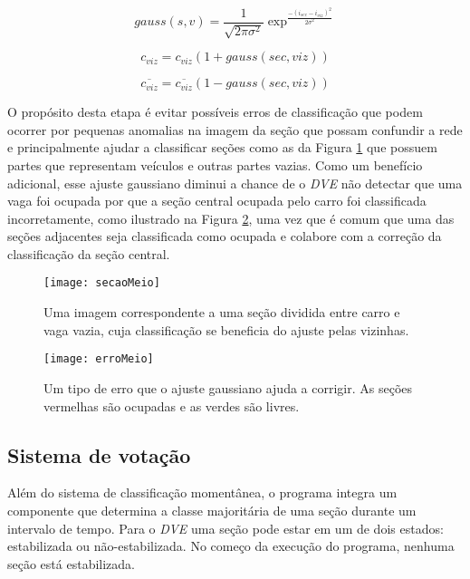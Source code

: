 \begin{equation}
	gauss(s,v) = \frac{1}{\sqrt{2\pi\sigma^2}} \exp^{\frac{-(i_{sec}-i_{viz})^2}{2\sigma^2}} 
\label{eq:gaussiana}
\end{equation}

\begin{equation}
	c_{viz}  = c_{viz}(1+gauss(sec,viz))
\label{eq:novoCv}
\end{equation}

\begin{equation}
	\overline{c_{viz}}  = \overline{c_{viz}}(1-gauss(sec,viz))
\label{eq:novoRCv}
\end{equation}

O propósito desta etapa é evitar possíveis erros de classificação que podem ocorrer por pequenas anomalias na imagem da seção que possam confundir a rede e principalmente ajudar a classificar seções como as da Figura \ref{fig:secaoMeio} que possuem partes que representam veículos e outras partes vazias. Como um benefício adicional, esse ajuste gaussiano diminui a chance de o \textit{DVE} não detectar que uma vaga foi ocupada por que a seção central ocupada pelo carro foi classificada incorretamente, como ilustrado na Figura \ref{fig:erromeio}, uma vez que é comum que uma das seções adjacentes seja classificada como ocupada e colabore com a correção da classificação da seção central.


\begin{figure}
	\centering
	\texttt{[image: secaoMeio]}
	\caption{Uma imagem correspondente a uma seção dividida entre carro e vaga vazia, cuja classificação se beneficia do ajuste pelas vizinhas.}
	\label{fig:secaoMeio}
	\centering
\end{figure}

\begin{figure}
	\centering
	\texttt{[image: erroMeio]}
	\caption{Um tipo de erro que o ajuste gaussiano ajuda a corrigir. As seções vermelhas são ocupadas e as verdes são livres.}
	\label{fig:erromeio}
	\centering
\end{figure}

\subsection{Sistema de votação}\label{sec:votacao}

Além do sistema de classificação momentânea, o programa integra um componente que determina a classe majoritária de uma seção durante um intervalo de tempo. Para o \textit{DVE} uma seção pode estar em um de dois estados: estabilizada ou não-estabilizada. No começo da execução do programa, nenhuma seção está estabilizada. 

